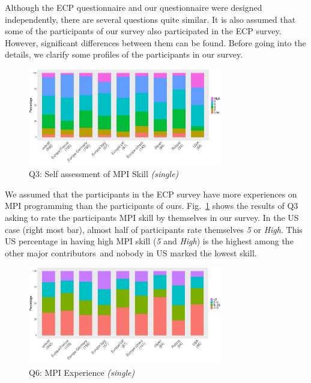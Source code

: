 \documentclass[preprint,5p,times]{elsarticle}
\def\myquote#1{{\it #1}}
\def\mcountries{major contributors}%
\begin{document}
Although the ECP questionnaire and our questionnaire were designed
independently, there are several questions quite similar. It is also
assumed that some of the participants of our survey
also participated in the ECP survey. However, significant differences
between them can be found. Before going into the details, we clarify
some profiles of the participants in our survey.

\begin{figure}[htb]
  \begin{center}
    \includegraphics[width=8.5cm]{R-scripts/Q3.pdf}
    \caption{Q3: Self assessment of MPI Skill {\it(single)}}
    \label{fig:mpi-skill}
  \end{center}
\end{figure}

We assumed that the participants in the ECP survey have more
experiences on MPI
programming than the participants of ours. Fig.~\ref{fig:mpi-skill}
shows the results of Q3 asking to rate the participants MPI skill by
themselves in our survey.  In the US case
(right most bar), almost half of participants rate themselves
\myquote{5} or \myquote{High}. This US percentage in having high MPI
skill (\myquote{5} and \myquote{High}) is the highest among
the other \mcountries\  and nobody in US marked the lowest skill.

\begin{figure}[htb]
  \begin{center}
    \includegraphics[width=8.5cm]{R-scripts/Q6.pdf}
    \caption{Q6: MPI Experience {\it(single)}}
    \label{fig:mpi-experience}
  \end{center}
\end{figure}
\end{document}
